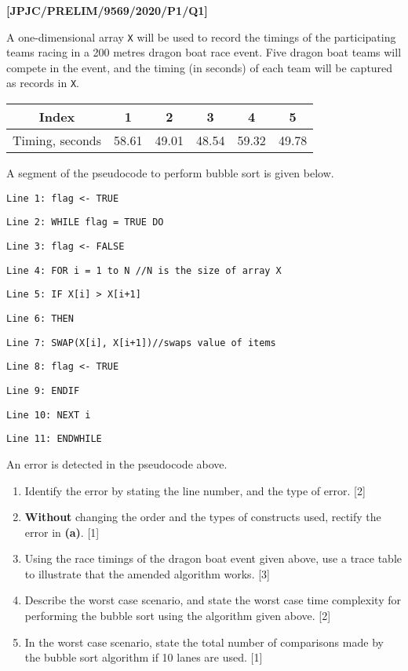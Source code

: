 \item \textbf{{[}JPJC/PRELIM/9569/2020/P1/Q1{]} }

A one-dimensional array \texttt{X} will be used to record the timings
of the participating teams racing in a 200 metres dragon boat race
event. Five dragon boat teams will compete in the event, and the timing
(in seconds) of each team will be captured as records in \texttt{X}. 
\noindent \begin{center}
\begin{tabular}{|c|c|c|c|c|c|}
\hline 
Index & 1  & 2 & 3  & 4  & 5\tabularnewline
\hline 
\hline 
Timing, seconds & 58.61  & 49.01  & 48.54  & 59.32  & 49.78\tabularnewline
\hline 
\end{tabular} 
\par\end{center}

A segment of the pseudocode to perform bubble sort is given below. 

\noindent\begin{minipage}[t]{1\columnwidth}%
\texttt{Line 1: \qquad{}flag <- TRUE }

\texttt{Line 2: \qquad{}WHILE flag = TRUE DO }

\texttt{Line 3: \qquad{}\qquad{}flag <- FALSE }

\texttt{Line 4: \qquad{}\qquad{}FOR i = 1 to N //N is the size of
array X }

\texttt{Line 5: \qquad{}\qquad{}\qquad{}IF X{[}i{]} > X{[}i+1{]} }

\texttt{Line 6: \qquad{}\qquad{}\qquad{}\qquad{}THEN }

\texttt{Line 7: \qquad{}\qquad{}\qquad{}\qquad{}\qquad{}SWAP(X{[}i{]},
X{[}i+1{]})//swaps value of items }

\texttt{Line 8: \qquad{}\qquad{}\qquad{}\qquad{}\qquad{}flag
<- TRUE }

\texttt{Line 9: \qquad{}\qquad{}\qquad{}ENDIF }

\texttt{Line 10: \qquad{}\qquad{}NEXT i }

\texttt{Line 11: \qquad{}ENDWHILE}%
\end{minipage} An error is detected in the pseudocode above. 
\begin{enumerate}
\item Identify the error by stating the line number, and the type of error.\hfill{}
{[}2{]}
\item \textbf{Without} changing the order and the types of constructs used,
rectify the error in \textbf{(a)}. \hfill{}{[}1{]}
\item Using the race timings of the dragon boat event given above, use a
trace table to illustrate that the amended algorithm works. \hfill{}{[}3{]}
\item Describe the worst case scenario, and state the worst case time complexity
for performing the bubble sort using the algorithm given above. \hfill{}{[}2{]}
\item In the worst case scenario, state the total number of comparisons
made by the bubble sort algorithm if 10 lanes are used. \hfill{}{[}1{]}
\end{enumerate}